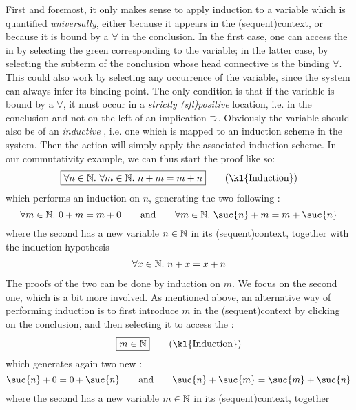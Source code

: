 First and foremost, it only makes sense to apply induction to a variable which
is quantified \emph{universally}, either because it appears in the
\kl(sequent){context}, or because it is bound by a $\forall$ in the conclusion.
In the first case, one can access the  in  by
selecting the green  corresponding to the variable; in the latter case,
by selecting the subterm of the conclusion whose head connective is the binding
$\forall$. This could also work by selecting any occurrence of
the variable, since the system can always infer its binding point. The only
condition is that if the variable is bound by a $\forall$, it must occur in a
\emph{strictly \kl(sfl){positive}} location, i.e. in the conclusion and not on
the left of an implication $\supset$. Obviously the variable should also be of an
\emph{inductive} , i.e. one which is mapped to an induction scheme in
the system. Then the
 action will simply apply the associated induction scheme. In
our commutativity example, we can thus start the proof like so:
$$\select{\forall n \in \nats.\ \forall m \in \nats.\ n + m = m + n} \qquad
\text{(\kl{Induction})}$$
which performs an induction on $n$, generating the two following :
$$\forall m \in \nats.\ 0 + m = m + 0 \qquad \text{and} \qquad \forall m \in
\nats.\ \suc{n} + m = m + \suc{n}$$
where the second  has a new variable $n \in \mathbb{N}$ in its
\kl(sequent){context}, together with the induction hypothesis
\begin{gather}
  \forall x \in \mathbb{N}.\ n + x = x + n \label{hyp:::1}
\end{gather}
The proofs of the two  can be done by induction on $m$. We focus on the
second one, which is a bit more involved. As mentioned above, an alternative way
of performing induction is to first introduce $m$ in the \kl(sequent){context} by clicking on
the conclusion, and then selecting it to access the :
$$\select{m \in \nats} \qquad \text{(\kl{Induction})}$$
which generates again two new :
$$\suc{n} + 0 = 0 + \suc{n} \qquad \text{and} \qquad \suc{n} + \suc{m} = \suc{m} + \suc{n}$$ where
the second  has a new variable $m \in \mathbb{N}$ in its \kl(sequent){context}, together
